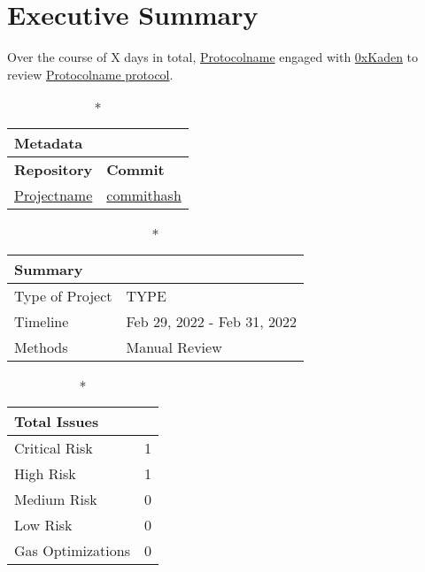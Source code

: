 \hypertarget{executive-summary}{%
\section{Executive Summary}\label{executive-summary}}

Over the course of X days in total, \href{https://protocolname.com}{Protocolname} engaged with
\href{https://twitter.com/0xKaden}{0xKaden} to review
\href{https://github.com/permalink-to-protocolname}{Protocolname protocol}.

{\renewcommand{\arraystretch}{1.5}
\begin{longtable}[c]{|p{}|p{}|}
\caption*{\textbf{Metadata}} \\ %
\hline \textbf{Repository} & \textbf{Commit} \\ \hline
\href{https://github.com/permalink}{Projectname} &
\href{https://github.com/permalink/commit/commithash}{commithash} \\
\hline
\end{longtable}
}

{\renewcommand{\arraystretch}{1.5}
\begin{longtable}[]{|p{}|p{}|}

\caption*{\textbf{Summary}} \\ %
\hline Type of Project & TYPE \\   %
\hline Timeline & Feb 29, 2022 - Feb 31, 2022   \\
\hline Methods & Manual Review \\
\hline
\end{longtable}
}

{\renewcommand{\arraystretch}{1.5}
\begin{longtable}[]{|p{}|p{}|}
\caption*{\textbf{Total Issues}} \\ %
\hline Critical Risk & 1 \\ %
\hline High Risk & 1 \\
\hline Medium Risk & 0 \\ 
\hline Low Risk & 0 \\
\hline Gas Optimizations & 0 \\
\hline
\end{longtable}
}
